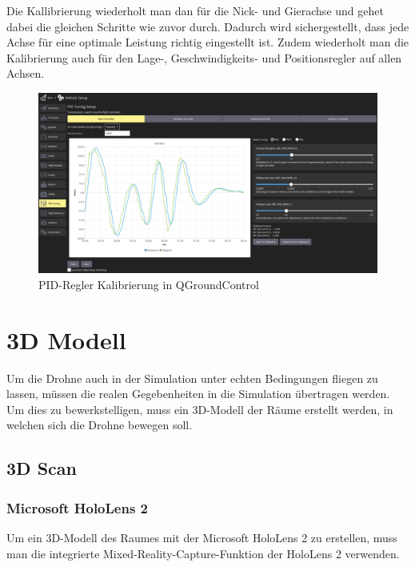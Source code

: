 Die Kallibrierung wiederholt man dan für die Nick- und Gierachse und gehet dabei die gleichen Schritte wie zuvor durch. Dadurch wird sichergestellt, dass jede Achse für eine optimale Leistung richtig eingestellt ist. Zudem wiederholt man die Kalibrierung auch für den Lage-, Geschwindigkeits- und Positionsregler auf allen Achsen.
\begin{figure}[H]
    \includegraphics[width=\textwidth]{./images/qgc_mc_pid_tuning_rate_controller.950965c8.png}
    \caption{PID-Regler Kalibrierung in QGroundControl}\label{fig:accelerometer-calibration}
\end{figure}

\section{3D Modell} \label{3d_modell:section}
Um die Drohne auch in der Simulation unter echten Bedingungen fliegen zu lassen, müssen die realen Gegebenheiten in die Simulation übertragen werden. Um dies zu bewerkstelligen, muss ein 3D-Modell der Räume erstellt werden, in welchen sich die Drohne bewegen soll.
    \subsection{3D Scan} \label{3d-scan:subsection}

        \subsubsection{Microsoft HoloLens 2} \label{hololens:subsubsection}
        Um ein 3D-Modell des Raumes mit der Microsoft HoloLens 2 zu erstellen, muss man die integrierte Mixed-Reality-Capture-Funktion der HoloLens 2 verwenden.
        
